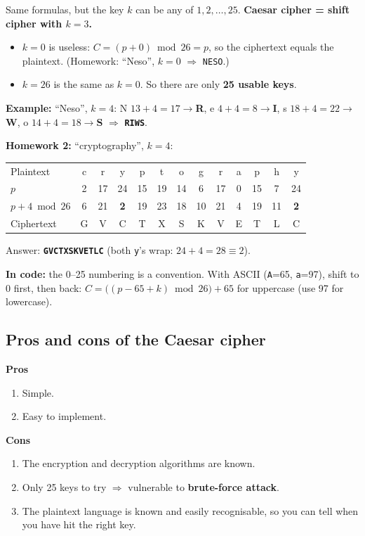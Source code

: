 \documentclass[10pt,a4paper]{article}
\newcommand{\hl}[1]{\cellcolor{warn!18}\textbf{#1}}
\newcommand{\ttx}[1]{\texttt{#1}}
\begin{document}
\begin{keybox}
Same formulas, but the key $k$ can be any of $1,2,\dots,25$. \textbf{Caesar cipher = shift cipher with $k=3$.}
\end{keybox}
\begin{itemize}
  \item $k=0$ is useless: $C = (p+0) \bmod 26 = p$, so the ciphertext equals the plaintext. (Homework: ``Neso'', $k=0$ $\Rightarrow$ \ttx{NESO}.)
  \item $k=26$ is the same as $k=0$. So there are only \textbf{25 usable keys}.
\end{itemize}

\textbf{Example:} ``Neso'', $k=4$: \;
N $13{+}4{=}17\to$\textbf{R},\;
e $4{+}4{=}8\to$\textbf{I},\;
s $18{+}4{=}22\to$\textbf{W},\;
o $14{+}4{=}18\to$\textbf{S} \;$\Rightarrow$\; \textbf{\ttx{RIWS}}.

\textbf{Homework 2:} ``cryptography'', $k=4$:
\begin{center}\small\setlength{\tabcolsep}{4.5pt}
\begin{tabular}{@{}l*{12}{c}@{}}
\toprule
Plaintext & c&r&y&p&t&o&g&r&a&p&h&y\\
$p$ & 2&17&24&15&19&14&6&17&0&15&7&24\\
$p+4 \bmod 26$ & 6&21&\hl{2}&19&23&18&10&21&4&19&11&\hl{2}\\
Ciphertext & G&V&C&T&X&S&K&V&E&T&L&C\\
\bottomrule
\end{tabular}
\end{center}
Answer: \textbf{\ttx{GVCTXSKVETLC}} (both \ttx{y}'s wrap: $24+4=28 \equiv 2$).

\textbf{In code:} the 0--25 numbering is a convention. With ASCII (\ttx{A}=65, \ttx{a}=97), shift to 0 first, then back:
\;$C = \big((p - 65 + k) \bmod 26\big) + 65$ for uppercase (use 97 for lowercase).

\subsection{Pros and cons of the Caesar cipher}
\begin{minipage}[t]{0.3\textwidth}
\textbf{Pros}
\begin{enumerate}[leftmargin=1.5em]
  \item Simple.
  \item Easy to implement.
\end{enumerate}
\end{minipage}\hfill
\begin{minipage}[t]{0.66\textwidth}
\textbf{Cons}
\begin{enumerate}[leftmargin=1.5em]
  \item The encryption and decryption algorithms are known.
  \item Only 25 keys to try $\Rightarrow$ vulnerable to \textbf{brute-force attack}.
  \item The plaintext language is known and easily recognisable, so you can tell when you have hit the right key.
\end{enumerate}
\end{minipage}
\end{document}
